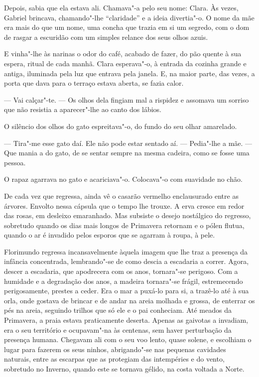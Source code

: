 Depois, sabia que ela estava ali. Chamava"-a pelo seu nome: Clara. Às
vezes, Gabriel brincava, chamando"-lhe ``claridade'' e a ideia
divertia"-o. O nome da mãe era mais do que um nome, uma concha que trazia
em si um segredo, com o dom de rasgar a escuridão com um simples relance
dos seus olhos azuis.

E vinha"-lhe às narinas o odor do café, acabado de fazer, do pão quente à
sua espera, ritual de cada manhã. Clara esperava"-o, à entrada da cozinha
grande e antiga, iluminada pela luz que entrava pela janela. E, na maior
parte, das vezes, a porta que dava para o terraço estava aberta, se
fazia calor.

--- Vai calçar"-te. --- Os olhos dela fingiam mal a rispidez e assomava um
sorriso que não resistia a aparecer"-lhe ao canto dos lábios.

O silêncio dos olhos do gato espreitava"-o, do fundo do seu olhar
amarelado.

--- Tira"-me esse gato daí. Ele não pode estar sentado aí. --- Pedia"-lhe a
mãe. --- Que mania a do gato, de se sentar sempre na mesma cadeira, como
se fosse uma pessoa.

O rapaz agarrava no gato e acariciava"-o. Colocava"-o com suavidade no
chão.

De cada vez que regressa, ainda vê o casarão vermelho enclausurado entre
as árvores. Envolto nessa cápsula que o tempo lhe trouxe. A erva cresce
em redor das rosas, em desleixo emaranhado. Mas subsiste o desejo
nostálgico do regresso, sobretudo quando os dias mais longos de
Primavera retornam e o pólen flutua, quando o ar é invadido pelos
esporos que se agarram à roupa, à pele.

Florimundo regressa incansavelmente àquela imagem que lhe traz a
presença da infância concentrada, lembrando"-se de como descia a
escadaria a correr. Agora, descer a escadaria, que apodrecera com os
anos, tornara"-se perigoso. Com a humidade e a degradação dos anos, a
madeira tornara"-se frágil, estremecendo perigosamente, prestes a ceder.
Era o mar a puxá-lo para si, a trazê-lo até à sua orla, onde gostava de
brincar e de andar na areia molhada e grossa, de enterrar os pés na
areia, seguindo trilhos que só ele e o pai conheciam. Até meados da
Primavera, a praia estava praticamente deserta. Apenas as gaivotas a
invadiam, era o seu território e ocupavam"-na às centenas, sem haver
perturbação da presença humana. Chegavam ali com o seu voo lento, quase
solene, e escolhiam o lugar para fazerem os seus ninhos, abrigando"-se
nas pequenas cavidades naturais, entre as escarpas que as protegiam das
intempéries e do vento, sobretudo no Inverno, quando este se tornava
gélido, na costa voltada a Norte.


